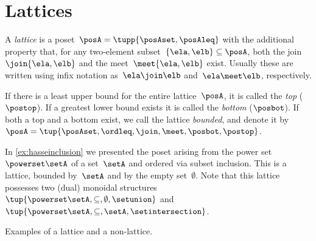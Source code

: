 
\section{Lattices}


\begin{definition}[Lattice]
    \label{def:lattice}
    A \emph{lattice} is a poset~$\posA=\tupp{\posAset,\posAleq}$ with the additional property that, for any two-element subset~$\{\ela, \elb \} \subseteq \posA$, both the join~$\join \{\ela, \elb \}$ and the meet~$\meet \{\ela, \elb \}$ exist.
    Usually these are written using infix notation as~$\ela \join \elb$ and~$\ela \meet \elb$, respectively.
\end{definition}


\begin{remark}
    \label{rem:bounded-lattices}
    \label{def:top}
    \label{def:bot}
    If there is a least upper bound for the entire lattice~$\posA$, it is called the \emph{top} ($\postop$).
    If a greatest lower bound exists it is called the \emph{bottom} ($\posbot$).
    If both a top and a bottom exist, we call the lattice \emph{bounded}, and denote it by~$\posA = \tup{\posAset,\ordleq,\join,\meet,\posbot,\postop}$.
\end{remark}

\begin{example}
    In \cref{ex:hasseinclusion} we presented the poset arising from the power set~$\powerset \setA$ of a set~$\setA$ and ordered via subset inclusion.
    This is a lattice, bounded by~$\setA$ and by the empty set~$\emptyset$.
    Note that this lattice possesses two (dual) monoidal structures~$\tup{\powerset \setA,\subseteq,\emptyset,\setunion}$ and~$\tup{\powerset \setA,\subseteq,\setA,\setintersection}$.
\end{example}

\begin{marginfigure}
    \centering

    \caption{Examples of a lattice and a non-lattice. }
    \label{fig:exlattice}
\end{marginfigure}

